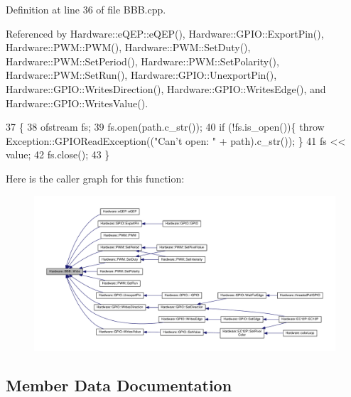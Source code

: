 Definition at line 36 of file B\+B\+B.\+cpp.



Referenced by Hardware\+::e\+Q\+E\+P\+::e\+Q\+E\+P(), Hardware\+::\+G\+P\+I\+O\+::\+Export\+Pin(), Hardware\+::\+P\+W\+M\+::\+P\+W\+M(), Hardware\+::\+P\+W\+M\+::\+Set\+Duty(), Hardware\+::\+P\+W\+M\+::\+Set\+Period(), Hardware\+::\+P\+W\+M\+::\+Set\+Polarity(), Hardware\+::\+P\+W\+M\+::\+Set\+Run(), Hardware\+::\+G\+P\+I\+O\+::\+Unexport\+Pin(), Hardware\+::\+G\+P\+I\+O\+::\+Writes\+Direction(), Hardware\+::\+G\+P\+I\+O\+::\+Writes\+Edge(), and Hardware\+::\+G\+P\+I\+O\+::\+Writes\+Value().


\begin{DoxyCode}
37     \{
38         ofstream fs;
39         fs.open(path.c\_str());
40         \textcolor{keywordflow}{if} (!fs.is\_open())\{ \textcolor{keywordflow}{throw} Exception::GPIOReadException((\textcolor{stringliteral}{"Can't open: "} + path).c\_str()); \}
41         fs << value;
42         fs.close();
43     \}
\end{DoxyCode}


Here is the caller graph for this function\+:\nopagebreak
\begin{figure}[H]
\begin{center}
\leavevmode
\includegraphics[width=350pt]{class_hardware_1_1_b_b_b_a155cc06f76d82a6b690ce5ea08e7c68e_icgraph}
\end{center}
\end{figure}




\subsection{Member Data Documentation}
\hypertarget{class_hardware_1_1_b_b_b_a66d583952f3949a732ee15eea81e80e5}{}
